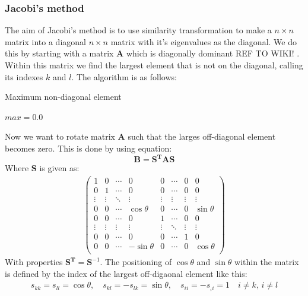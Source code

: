 \documentclass{article}
\newcommand\ppmat[1]{\begin{pmatrix}#1\end{pmatrix}}
\newcommand{\V}[1]{\mathbf{#1}}
\newcommand{\husk}[1]{\color{red} #1 \color{black}}
\begin{document}
\subsubsection{Jacobi's method}
The aim of Jacobi's method is to use similarity transformation to make a $n \times n$ matrix into a diagonal $n \times n$ matrix with it's eigenvalues as the diagonal. We do this by starting with a matrix $\V{A}$ which is diagonally dominant \husk{REF TO WIKI!}. Within this matrix we find the largest element that is not on the diagonal, calling its indexes $k$ and $l$. The algorithm is as follows:
\begin{algorithm}[H]
\small
\caption{Maximum non-diagonal element}\label{alg:max_offdiag}
\begin{algorithmic}[1]
\State $max = 0.0$
\EndIf
\EndFor
\EndFor
\end{algorithmic}
\end{algorithm}
Now we want to rotate matrix $\V{A}$ such that the larges off-diagonal element becomes zero. This is done by using equation:
\begin{equation}
\V{B} = \V{S}^{\V{T}} \V{A} \V{S}
\label{eq:symtrans}
\end{equation}
Where $\V{S}$ is given as:
\begin{align*}
\ppmat{1 & 0 & \cdots & 0 & 0 & \cdots & 0 & 0 \\
	   0 & 1 & \cdots & 0 & 0 & \cdots & 0 & 0 \\
	   \vdots & \vdots & \ddots & \vdots & \vdots & \vdots & \vdots & \vdots \\
	   0 & 0 & \cdots & \cos \theta & 0 & \cdots & 0 & \sin \theta \\
	   0 & 0 & \cdots & 0 & 1 & \cdots & 0 & 0 \\
	   \vdots & \vdots & \vdots & \vdots & \vdots & \ddots & \vdots & \vdots \\
	   0 & 0 & \cdots & 0 & 0 & \cdots & 1 & 0 \\
	   0 & 0 & \cdots & -\sin \theta & 0 & \cdots & 0 & \cos \theta \\}
\end{align*}
With properties $\V{S}^{\V{T}} = \V{S}^{-1}$.
The positioning of $\cos \theta$ and $\sin \theta$ within the matrix is defined by the index of the largest off-digaonal element like this:
\begin{align*}
s_{kk} = s_{ll} = \cos\theta , \quad s_{kl} = -s_{lk} = \sin \theta, \quad s_{ii} = -s_{_ii} = 1 \quad i \neq k, \, i \neq l
\end{align*}
\end{document}
